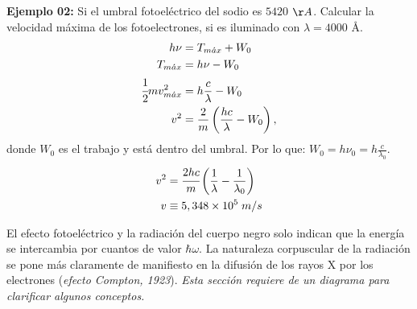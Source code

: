\documentclass[../main]{subfiles}
\begin{document}
\begin{multicols}{2}
\textbf{Ejemplo 02:} Si el umbral fotoeléctrico del sodio es $5420$ $\AA$. Calcular la velocidad máxima de los fotoelectrones, si es iluminado con $\lambda=4000$ \AA.
\begin{align}
    h\nu&=T_{m\Acute{a}x}+W_0\\
    T_{m\Acute{a}x}&=h\nu-W_0\\
    \cfrac{1}{2}mv^2_{m\Acute{a}x}&=h\frac{c}{\lambda}-W_0\\
    v^2&=\frac{2}{m}\left(\frac{hc}{\lambda}-W_0\right),
\end{align}
donde $W_0$ es el trabajo y está dentro del umbral. Por lo que: $\displaystyle W_0=h\nu_0=h\frac{c}{\lambda_0}$.
\begin{align}
    v^2&=\cfrac{2hc}{m}\left(\frac{1}{\lambda}-\frac{1}{\lambda_0}\right)\\
    v&\equiv 5,348 \times 10^5\; m/s
\end{align}
\end{multicols}
El efecto fotoeléctrico y la radiación del cuerpo negro solo indican que la energía se intercambia por cuantos de valor $\hbar\omega$. La naturaleza corpuscular de la radiación se
pone más claramente de manifiesto en la difusión de los rayos X por los electrones (\textit{efecto Compton, 1923}). \textit{Esta sección requiere de un diagrama para clarificar algunos conceptos.}
\end{document}
